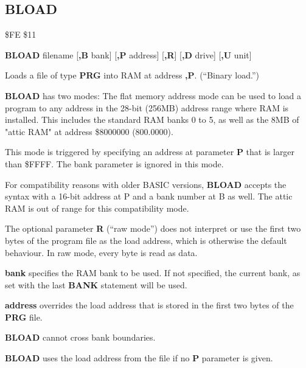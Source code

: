 \subsection{BLOAD}
\begin{description}[leftmargin=2cm,style=nextline]
\item [Token:]    \$FE \$11

\item [Format:]   {\bf BLOAD} filename [{\bf,B} bank] [{\bf,P} address] [{\bf,R}] [{\bf,D} drive] [{\bf,U} unit]

\item [Usage:]    Loads a file of type {\bf PRG} into RAM at address {\bf,P}. (``Binary load.'')

                  {\bf BLOAD} has two modes: The flat memory address mode can be used to load a program to any address in the 28-bit (256MB) address range where RAM is installed. This includes the standard RAM banks 0 to 5, as well as the 8MB of "attic RAM" at address \$8000000 (800.0000).

                  This mode is triggered by specifying an address at parameter {\bf P} that is larger than \$FFFF. The bank parameter is ignored in this mode.

                  For compatibility reasons with older BASIC versions, {\bf BLOAD} accepts the syntax with a 16-bit address at P and a bank number at B as well. The attic RAM is out of range for this compatibility mode.

                  The optional parameter {\bf R} (``raw mode'') does not interpret or use the first two bytes of the program file as the load address, which is otherwise the default behaviour. In raw mode, every byte is read as data.

                  \filenamedefinition

                  {\bf bank} specifies the RAM bank to be used. If not specified, the current bank, as set with the last {\bf BANK} statement will be used.

                  {\bf address} overrides the load address that is stored in the first two bytes of the {\bf PRG} file.

                  \drivedefinition

                  \unitdefinition

\item [Remarks:]  {\bf BLOAD} cannot cross bank boundaries.

                  {\bf BLOAD} uses the load address from the file if no {\bf P} parameter is given.


\end{description}
